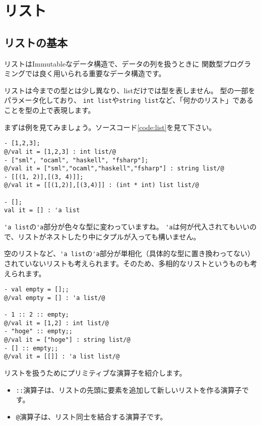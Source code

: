 \documentclass[11pt,a4paper]{article}
\begin{document}
\label{sec:list}
\section{リスト}
\subsection{リストの基本}
リストはImmutableなデータ構造で、データの列を扱うときに
関数型プログラミングでは良く用いられる重要なデータ構造です。

リストは今までの型とは少し異なり、listだけでは型を表しません。
型の一部をパラメータ化しており、
\lstinline{int list}や\lstinline{string list}など、「何かのリスト」であることを型の上で表現します。

まずは例を見てみましょう。ソースコード\ref{code:list}を見て下さい。

\begin{lstlisting}[caption=色々なリスト,label=code:list]
- [1,2,3];
@/val it = [1,2,3] : int list/@
- ["sml", "ocaml", "haskell", "fsharp"];
@/val it = ["sml","ocaml","haskell","fsharp"] : string list/@
- [[(1, 2)],[(3, 4)]];
@/val it = [[(1,2)],[(3,4)]] : (int * int) list list/@

- [];
val it = [] : 'a list
\end{lstlisting}

\lstinline{'a list}の\lstinline{'a}部分が色々な型に変わっていますね。
\lstinline{'a}は何が代入されてもいいので、リストがネストしたり中にタプルが入っても構いません。

空のリストなど、\lstinline{'a list}の\lstinline{'a}部分が単相化（具体的な型に置き換わってない）
されていないリストも考えられます。そのため、多相的なリストというものも考えられます。

\begin{lstlisting}[caption=多相的なリスト,label=code:poly-list]
- val empty = [];;
@/val empty = [] : 'a list/@

- 1 :: 2 :: empty;
@/val it = [1,2] : int list/@
- "hoge" :: empty;;
@/val it = ["hoge"] : string list/@
- [] :: empty;;
@/val it = [[]] : 'a list list/@
\end{lstlisting}

リストを扱うためにプリミティブな演算子を紹介します。
\begin{itemize}
\item \lstinline{::}演算子は、リストの先頭に要素を追加して新しいリストを作る演算子です。
\item \lstinline{@}演算子は、リスト同士を結合する演算子です。
\end{itemize}
\end{document}

